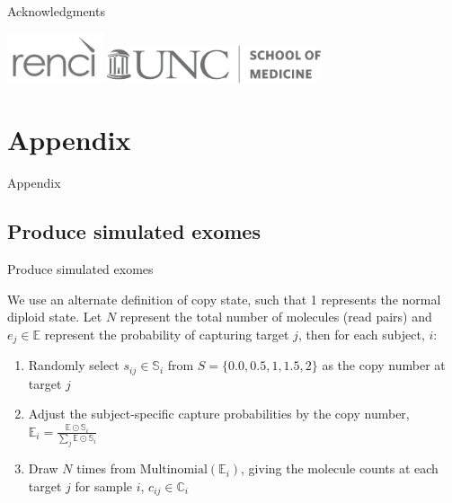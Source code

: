 \documentclass[
  10pt,
  ignorenonframetext,
  m]{beamer}
\begin{document}
\begin{frame}{Acknowledgments}
\bigskip

\centering

\includegraphics[height=4em]{images/renci-logo_grey.pdf} \hspace{2ex}
\includegraphics[height=3em]{images/SOM_gray.pdf}

\appendix

\end{frame}

\hypertarget{appendix}{%
\section*{Appendix}\label{appendix}}

\begin{frame}{Appendix}
\protect\hypertarget{appendix-1}{}

\label{apptoc}

\tableofcontents

\end{frame}

\hypertarget{produce-simulated-exomes}{%
\subsection{Produce simulated exomes}\label{produce-simulated-exomes}}

\begin{frame}{Produce simulated exomes}

\medskip

We use an alternate definition of copy state, such that 1 represents the
normal diploid state. Let \(N\) represent the total number of molecules
(read pairs) and \(e_j \in \mathbb{E}\) represent the probability of
capturing target \(j\), then for each subject, \(i\):

\begin{enumerate}
\item
  Randomly select \(s_{ij} \in \mathbb{S}_i\) from
  \(S = \{0.0, 0.5, 1, 1.5, 2\}\) as the copy number at target \(j\)
\item
  Adjust the subject-specific capture probabilities by the copy number,
  \(\mathbb{E}_i = \frac{\mathbb{E} \odot \mathbb{S}_{i}}{\sum_j \mathbb{E} \odot \mathbb{S}_{i}}\)
\item
  Draw \(N\) times from \(\text{Multinomial}(\mathbb{E}_i)\), giving the
  molecule counts at each target \(j\) for sample \(i\),
  \(c_{ij} \in \mathbb{C}_i\)
\end{enumerate}

\end{frame}
\end{document}
